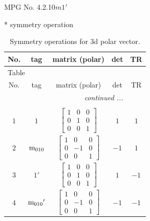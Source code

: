 \documentclass[fleqn,8pt]{jsarticle}
\begin{document}
\setcounter{MaxMatrixCols}{32}

\renewcommand{\tablename}{Table~}
\renewcommand{\figurename}{Figure~}
\begin{center}
\LARGE
MPG No. 4.2.10\quad$m1'$
\end{center}
* symmetry operation
\renewcommand{\arraystretch}{1.3}
\begin{longtable}{ccccc}
\caption{Symmetry operations for 3d polar vector.}
 \\
 \hline \hline
No. & tag & matrix (polar) & det & TR \\ \hline \endfirsthead

\multicolumn{4}{l}{\tablename\ \thetable{}} \\
 \hline \hline
No. & tag & matrix (polar) & det & TR \\ \hline \endhead

 \hline \hline
\multicolumn{4}{r}{\footnotesize\it continued ...} \\ \endfoot

 \hline \hline
\multicolumn{4}{r}{} \\ \endlastfoot

$ 1 $ & $ 1 $ & $ \begin{bmatrix} 1 & 0 & 0 \\ 0 & 1 & 0 \\ 0 & 0 & 1 \end{bmatrix} $ & $ 1 $ & $ 1 $ \\ \hline
$ 2 $ & $ {\rm m}_{010} $ & $ \begin{bmatrix} 1 & 0 & 0 \\ 0 & -1 & 0 \\ 0 & 0 & 1 \end{bmatrix} $ & $ -1 $ & $ 1 $ \\ \hline
$ 3 $ & $ 1{}' $ & $ \begin{bmatrix} 1 & 0 & 0 \\ 0 & 1 & 0 \\ 0 & 0 & 1 \end{bmatrix} $ & $ 1 $ & $ -1 $ \\ \hline
$ 4 $ & $ {\rm m}_{010}{}' $ & $ \begin{bmatrix} 1 & 0 & 0 \\ 0 & -1 & 0 \\ 0 & 0 & 1 \end{bmatrix} $ & $ -1 $ & $ -1 $ \\
\end{longtable}
\end{document}
